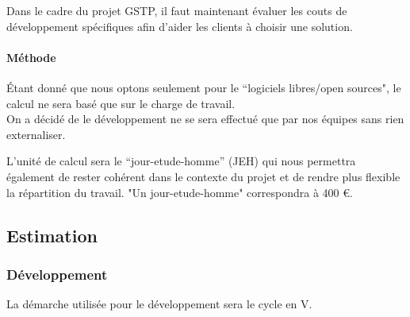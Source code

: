         Dans le cadre du projet GSTP, il faut maintenant évaluer les couts de développement spécifiques afin d'aider les clients à choisir une solution.

        \paragraph{Méthode}

        Étant donné que nous optons seulement pour le ``logiciels libres/open sources", le calcul ne sera basé que sur le charge de travail.\\

        On a décidé de le développement ne se sera effectué que par nos équipes sans rien externaliser.

        L’unité de calcul sera le ``jour-etude-homme'' (JEH) qui nous permettra également de rester cohérent dans le contexte du projet et de rendre plus flexible la répartition du travail. "Un jour-etude-homme" correspondra à 400 €.

    \subsection{Estimation}

    \subsubsection{Développement}
    La démarche utilisée pour le développement sera le cycle en V. 

